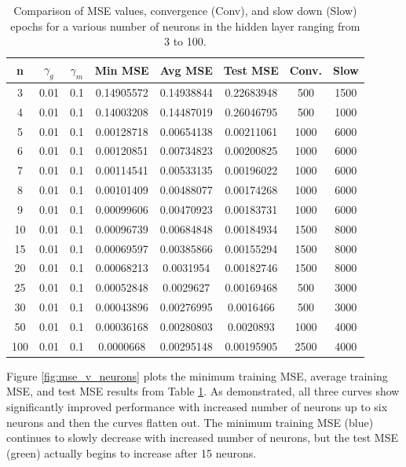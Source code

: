\documentclass[11pt,pdftex,portrait,letterpaper]{article}
\begin{document}
\begin{table}[h]
\label{t:nHidden}
\centering
\begin{tabular}{|c|c|c|c|c|c|c|c|}
\hline
\textbf{n} & \textbf{$\gamma_g$} & \textbf{$\gamma_m$} & \textbf{Min MSE} & \textbf{Avg MSE} & \textbf{Test MSE} & \textbf{Conv.} & \textbf{Slow} \\ 
\hline
3  & 0.01 & 0.1  & 0.14905572 & 0.14938844 & 0.22683948 & 500  & 1500  \\ 
4  & 0.01 & 0.1  & 0.14003208 & 0.14487019 & 0.26046795 & 500  & 1000  \\ 
5  & 0.01 & 0.1  & 0.00128718 & 0.00654138 & 0.00211061 & 1000 & 6000  \\ 
6  & 0.01 & 0.1  & 0.00120851 & 0.00734823 & 0.00200825 & 1000 & 6000  \\ 
7  & 0.01 & 0.1  & 0.00114541 & 0.00533135 & 0.00196022 & 1000 & 6000  \\ 
8  & 0.01 & 0.1  & 0.00101409 & 0.00488077 & 0.00174268 & 1000 & 6000  \\ 
9  & 0.01 & 0.1  & 0.00099606 & 0.00470923 & 0.00183731 & 1000 & 6000  \\ 
10 & 0.01 & 0.1  & 0.00096739 & 0.00684848 & 0.00184934 & 1500 & 8000  \\ 
15 & 0.01 & 0.1  & 0.00069597 & 0.00385866 & 0.00155294 & 1500 & 8000  \\ 
20 & 0.01 & 0.1  & 0.00068213 & 0.0031954  & 0.00182746 & 1500 & 8000  \\ 
25 & 0.01 & 0.1  & 0.00052848 & 0.0029627  & 0.00169468 & 500  & 3000  \\ 
30 & 0.01 & 0.1  & 0.00043896 & 0.00276995 & 0.0016466  & 500  & 3000  \\ 
50 & 0.01 & 0.1  & 0.00036168 & 0.00280803 & 0.0020893  & 1000 & 4000  \\ 
100& 0.01 & 0.1  & 0.0000668  & 0.00295148 & 0.00195905 & 2500 & 4000  \\ 
\hline
\end{tabular}
\caption{Comparison of MSE values, convergence (Conv), and slow down (Slow) epochs for a various number of neurons in the hidden layer ranging from 3 to 100.}
\end{table}

Figure \ref{fig:mse_v_neurons} plots the minimum training MSE, average training MSE, and test MSE results from Table \ref{t:nHidden}. As demonstrated, all three curves show significantly improved performance with increased number of neurons up to six neurons and then the curves flatten out. The 
minimum training MSE (blue) continues to slowly decrease with increased number of neurons, but the test MSE (green) actually begins to increase after 15 neurons. 
\end{document}

